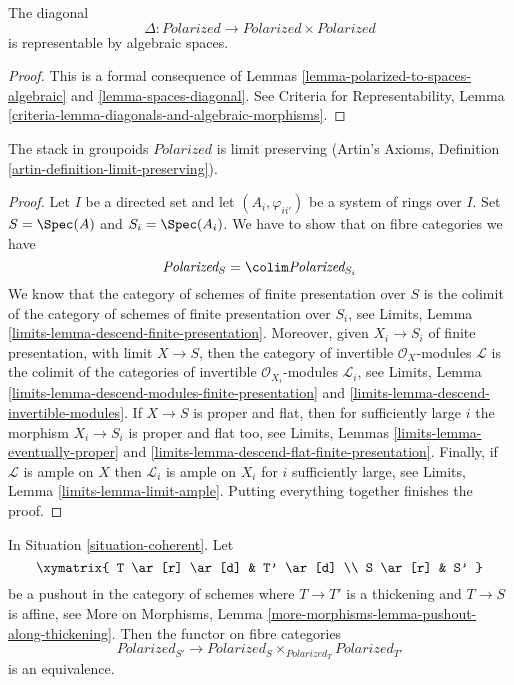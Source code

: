 \begin{lemma}
\label{lemma-polarized-diagonal}
The diagonal
$$
\Delta : \textit{Polarized} \longrightarrow
\textit{Polarized} \times \textit{Polarized}
$$
is representable by algebraic spaces.
\end{lemma}

\begin{proof}
This is a formal consequence of
Lemmas \ref{lemma-polarized-to-spaces-algebraic} and
\ref{lemma-spaces-diagonal}.
See Criteria for Representability, Lemma
\ref{criteria-lemma-diagonals-and-algebraic-morphisms}.
\end{proof}

\begin{lemma}
\label{lemma-polarized-limits}
The stack in groupoids $\textit{Polarized}$ is limit preserving
(Artin's Axioms, Definition \ref{artin-definition-limit-preserving}).
\end{lemma}

\begin{proof}
Let $I$ be a directed set and let $(A_i, \varphi_{ii'})$
be a system of rings over $I$. Set $S = \Spec(A)$ and
$S_i = \Spec(A_i)$. We have to show that on fibre categories we have
$$
\textit{Polarized}_S = \colim \textit{Polarized}_{S_i}
$$
We know that the category of schemes of finite presentation over
$S$ is the colimit of the category of schemes of finite presentation
over $S_i$, see
Limits, Lemma \ref{limits-lemma-descend-finite-presentation}.
Moreover, given $X_i \to S_i$ of finite presentation, with
limit $X \to S$, then the category of invertible
$\mathcal{O}_X$-modules $\mathcal{L}$ is the colimit of the categories
of invertible $\mathcal{O}_{X_i}$-modules $\mathcal{L}_i$, see
Limits, Lemma \ref{limits-lemma-descend-modules-finite-presentation} and
\ref{limits-lemma-descend-invertible-modules}.
If $X \to S$ is proper and flat, then for sufficiently large
$i$ the morphism $X_i \to S_i$ is proper and flat too, see
Limits, Lemmas \ref{limits-lemma-eventually-proper} and
\ref{limits-lemma-descend-flat-finite-presentation}.
Finally, if $\mathcal{L}$ is ample on $X$
then $\mathcal{L}_i$ is ample on $X_i$ for
$i$ sufficiently large, see
Limits, Lemma \ref{limits-lemma-limit-ample}.
Putting everything together finishes the proof.
\end{proof}

\begin{lemma}
\label{lemma-polarized-RS-star}
In Situation \ref{situation-coherent}. Let
$$
\xymatrix{
T \ar[r] \ar[d] & T' \ar[d] \\
S \ar[r] & S'
}
$$
be a pushout in the category of schemes where
$T \to T'$ is a thickening and $T \to S$ is affine, see
More on Morphisms, Lemma \ref{more-morphisms-lemma-pushout-along-thickening}.
Then the functor on fibre categories
$$
\textit{Polarized}_{S'}
\longrightarrow
\textit{Polarized}_S \times_{\textit{Polarized}_T} \textit{Polarized}_{T'}
$$
is an equivalence.
\end{lemma}

